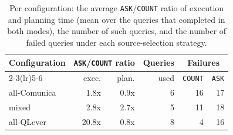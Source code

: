 \begin{table}[t]
	\centering
	\caption{Per configuration: the average \texttt{ASK}/\texttt{COUNT} ratio of
		execution and planning time (mean over the queries that completed in both
		modes), the number of such queries, and the number of failed queries under
		each source-selection strategy.}
	\label{tab:overall-ratio-adhoc}
	\begin{tabular}{lrrrrr}
		\toprule
		Configuration & \multicolumn{2}{c}{\texttt{ASK}/\texttt{COUNT} ratio} & Queries & \multicolumn{2}{c}{Failures} \\
		\cmidrule(lr){2-3}\cmidrule(lr){5-6}
		             & exec. & plan. & used & \texttt{COUNT} & \texttt{ASK} \\
		\midrule
		all-Comunica & 1.8x & 0.9x & 6 & 16 & 17 \\
		mixed        & 2.8x & 2.7x & 5 & 11 & 18 \\
		all-QLever   & 20.8x & 0.8x & 8 & 4 & 16 \\
		\bottomrule
	\end{tabular}
\end{table}
